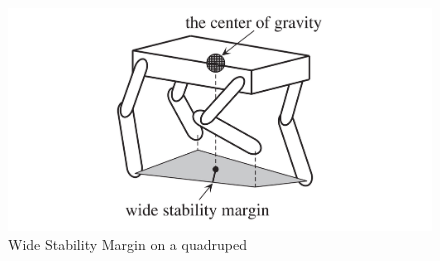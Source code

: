 \begin{figure}[thbp]
    \centering
    \includegraphics[width=0.95\linewidth]{Figures/WideStabilityMargin.png}
    \caption{Wide Stability Margin on a quadruped \cite{kimura2007adaptive}}
    \label{fig:WSM}
\end{figure}